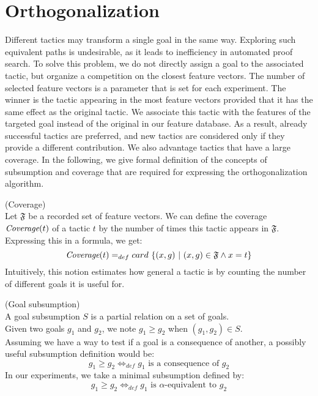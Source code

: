 \documentclass[runningheads,a4paper,draft]{svjour3}
\begin{document}


\section{Orthogonalization}

Different tactics may transform a single goal in the same way. Exploring such 
equivalent paths
is undesirable, as it leads to inefficiency in automated proof search.
To solve this problem, we do not directly assign a goal to the associated 
tactic, but organize a competition on the closest feature vectors. The number 
of selected feature vectors is a parameter that is set for each experiment.
The winner is the tactic appearing in the most feature vectors provided that it 
has the 
same effect as the original tactic. We associate this tactic with the features 
of the targeted goal instead of the original in our feature database. As a 
result, already successful tactics are preferred, and new tactics are 
considered only if they provide a different contribution. We also advantage 
tactics that have a large coverage. In the following, we give formal definition 
of the concepts of subsumption and coverage that are required for expressing 
the orthogonalization algorithm.


\begin{definition} (Coverage)\\ 
Let $\mathfrak{F}$ be a recorded set of feature vectors. We can define the 
coverage $\textit{\mbox{Coverage}}(t)$ of a tactic $t$ by the number of times 
this tactic 
appears in 
$\mathfrak{F}$. Expressing this in a formula, we get:
  \[\textit{\mbox{Coverage}}(t) =_{def} card\ \lbrace (x,g)\ |\ (x,g) \in 
  \mathfrak{F} 
  \wedge x 
  = t
  \rbrace  \]
Intuitively, this notion estimates how general a tactic is by counting the 
number of different goals it is useful for.
\end{definition}




\begin{definition} (Goal subsumption)\\ 
A goal subsumption $S$ is a partial relation on a set of goals.\\
Given two goals $g_1$ and $g_2$, we note $g_1 \ge g_2$ when  $(g_1,g_2) \in 
S$.\\
Assuming we have a way to test if a goal is a consequence of another, a 
possibly useful subsumption definition would be: 
\[g_1 \ge g_2  \Leftrightarrow_{def} g_1 \mbox{ is a consequence of } g_2\]
In our experiments, we take a minimal subsumption defined by:
\[g_1 \ge g_2  \Leftrightarrow_{def} g_1 \mbox{ is $\alpha$-equivalent to }  
 g_2\]
\end{definition}
\end{document}

